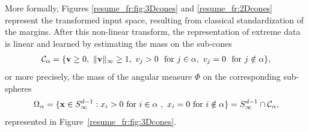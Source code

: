 More formally, Figures \ref{resume_fr:fig:3Dcones} and \ref{resume_fr:2Dcones} represent the transformed input space, resulting from classical standardization of the margins. After this non-linear transform, the representation of extreme data is linear and learned by estimating the mass on the sub-cones
\begin{align*}
 \mathcal{C}_\alpha = \{\mathbf v \ge 0,~\|\mathbf v\|_\infty \ge 1,~ v_j > 0 ~\text{ for } j \in \alpha,~ v_j = 0 ~\text{ for } j \notin \alpha \},
\end{align*}
or more precisely, the mass of the angular measure $\Phi$ on the corresponding sub-spheres
\begin{align*}
\Omega_{\alpha}  = \{\mathbf x \in S_{\infty}^{d-1} :  x_i > 0 \text{ for } i\in\alpha~,~  x_i = 0 \text{ for } i\notin \alpha   \} 
 = S_{\infty}^{d-1}\cap {\mathcal{C}}_\alpha,
\end{align*}
represented in Figure~\ref{resume_fr:fig:3Dcones}.

